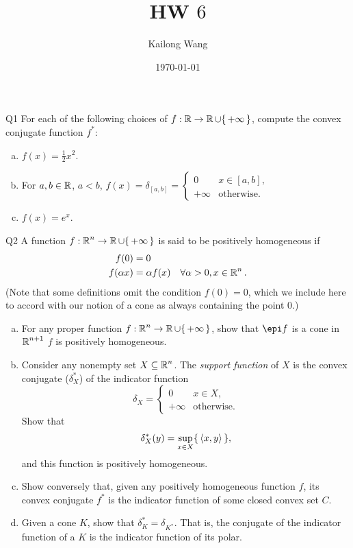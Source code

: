 \documentclass{article}
\title{HW $6$}
\author{Kailong Wang}
\date{\today}
\begin{document}
\maketitle

\begin{problem}
    {Q1}
    For each of the following choices of $f:\R\rightarrow \R\cup\set{+\infty}$, compute the convex conjugate function $f^*$:
    \begin{enumerate}[(a)]
        \item $f(x)=\frac{1}{2}x^2$.
        \item For $a ,b\in\operatorname{\mathbb{R}}$, $a<b$, ${
            f(x)=\delta_{[a, b]}= \begin{cases}
                0 & x\in [a, b],\\
                +\infty & \text{otherwise}.
            \end{cases}
            }$
        \item $f(x)=e^x$.
    \end{enumerate}
\end{problem}

\begin{problem}
    {Q2}
    A function $f:\R^n\rightarrow\R\cup\set{+\infty}$ is said to be positively homogeneous if
    \begin{align*}
        f(0) &= 0 \\
        f(\alpha x) &= \alpha f(x) \quad \forall \alpha > 0, x\in\operatorname{\mathbb{R}}^n.
    \end{align*}
    (Note that some definitions omit the condition $f(0) = 0$, which we include here to accord with our notion of a cone as always containing the point $0$.)
    \begin{enumerate}[(a)]
        \item For any proper function $f:\R^n\rightarrow\R\cup\set{+\infty}$, show that $\epi f$ is a cone in $\operatorname{\mathbb{R}}^{n+1}$ \iff $f$ is positively homogeneous.
        \item Consider any nonempty set $X\subseteq\operatorname{\mathbb{R}}^n$. The \textit{support function} of $X$ is the convex conjugate ($\delta_X^*$) of the indicator function \[\delta_X = \begin{cases}
            0 & x\in X,\\
            +\infty & \text{otherwise}.
        \end{cases}\]
        Show that \[\delta_X^*(y)=\sup_{x\in X}\set{\angles*{x, y}},\] and this function is positively homogeneous.
        \item Show conversely that, given any positively homogeneous function $f$, its convex conjugate $f^*$ is the indicator function of some closed convex set $C$.
        \item Given a cone $K$, show that $\delta_K^* = \delta_{K^*}$. That is, the conjugate of the indicator function of a $K$ is the indicator function of its polar.
    \end{enumerate}
\end{problem}
\end{document}
